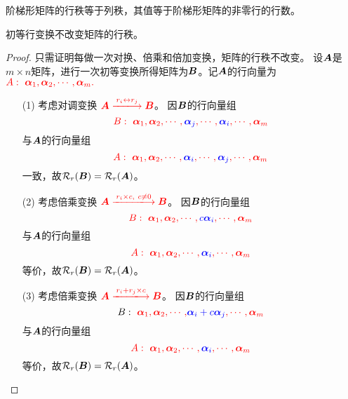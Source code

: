 \begin{frame}
\begin{jielun}
  阶梯形矩阵的行秩等于列秩，其值等于阶梯形矩阵的非零行的行数。
\end{jielun}
\end{frame}

\begin{frame}
\begin{dingli}
  初等行变换不改变矩阵的行秩。
\end{dingli}
\end{frame}

\begin{frame}
\begin{proof}
  只需证明每做一次对换、倍乘和倍加变换，矩阵的行秩不改变。    
  设$\MA$是$m\times n$矩阵，进行一次初等变换所得矩阵为$\MB$。记$\MA$的行向量为
  $\red{A:~\alphabd_1,\alphabd_2,\cd,\alphabd_m.}$ \pause 
  \begin{itemize}
  \item[(1)] 考虑对调变换
    $\red{\MA \xlongrightarrow[]{r_i\leftrightarrow r_j}\MB}$。
    因$\MB$的行向量组
    $$\red{B:~\alphabd_1,\alphabd_2,\cd,\blue{\alphabd_j},\cd,\blue{\alphabd_i},\cd,\alphabd_m}$$
    与$\MA$的行向量组
    $$\red{A:~\alphabd_1,\alphabd_2,\cd,\blue{\alphabd_i},\cd,\blue{\alphabd_j},\cd,\alphabd_m}$$
    一致，故$\rank_r(\MB)=\rank_r(\MA)$。 \pause 

  \item[(2)] 考虑倍乘变换
    $\red{\MA \xlongrightarrow[]{r_i\times c, ~c\ne 0}\MB}$。 
    因$\MB$的行向量组
    $$\red{B:~\alphabd_1,\alphabd_2,\cd,\blue{c\alphabd_i},\cd,\alphabd_m}$$
    与$\MA$的行向量组
    $$\red{A:~\alphabd_1,\alphabd_2,\cd,\blue{\alphabd_i},\cd,\alphabd_m}$$
    等价，故$\rank_r(\MB)=\rank_r(\MA)$。\pause 

  \item[(3)] 考虑倍乘变换
    $
    \red{\MA \xlongrightarrow[]{r_i+ r_j \times c  }\MB}
    $。 
    因$\MB$的行向量组
    $$B:~\red{\alphabd_1,\alphabd_2,\cd,}\blue{\alphabd_i+c\alphabd_j}\red{,\cd,\alphabd_m}$$
    与$\MA$的行向量组
    $$\red{A:~\alphabd_1,\alphabd_2,\cd,\blue{\alphabd_i},\cd,\alphabd_m}$$
    等价，故$\rank_r(\MB)=\rank_r(\MA)$。
  \end{itemize}
\end{proof}
\end{frame}



